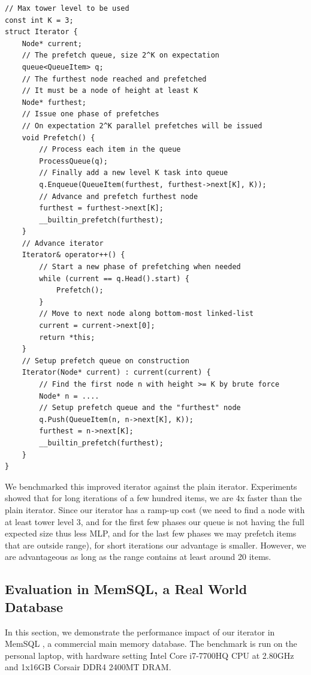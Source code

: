 \documentclass[11pt, usletter]{article}
\begin{document}
\singlespacing\begin{codebox}
\begin{verbatim}
// Max tower level to be used 
const int K = 3;
struct Iterator {
    Node* current;
    // The prefetch queue, size 2^K on expectation
    queue<QueueItem> q;
    // The furthest node reached and prefetched
    // It must be a node of height at least K
    Node* furthest;
    // Issue one phase of prefetches
    // On expectation 2^K parallel prefetches will be issued
    void Prefetch() {
        // Process each item in the queue 
        ProcessQueue(q);
        // Finally add a new level K task into queue
        q.Enqueue(QueueItem(furthest, furthest->next[K], K));
        // Advance and prefetch furthest node
        furthest = furthest->next[K];
        __builtin_prefetch(furthest);
    }
    // Advance iterator
    Iterator& operator++() {
        // Start a new phase of prefetching when needed
        while (current == q.Head().start) {
            Prefetch();
        }
        // Move to next node along bottom-most linked-list 
        current = current->next[0]; 
        return *this;
    }
    // Setup prefetch queue on construction 
    Iterator(Node* current) : current(current) {
        // Find the first node n with height >= K by brute force
        Node* n = ....
        // Setup prefetch queue and the "furthest" node
        q.Push(QueueItem(n, n->next[K], K));
        furthest = n->next[K];
        __builtin_prefetch(furthest);
    }
}
\end{verbatim}
\end{codebox}\doublespacing

We benchmarked this improved iterator against the plain iterator. 
Experiments showed that for long iterations of a few hundred items, 
we are 4x faster than the plain iterator.
Since our iterator has a ramp-up cost (we need to find a node with at least tower level 3, 
and for the first few phases our queue is not having the full expected size thus less MLP, 
and for the last few phases we may prefetch items that are outside range), 
for short iterations our advantage is smaller. 
However, we are advantageous as long as the range contains at least around 20 items.

\subsection{Evaluation in MemSQL, a Real World Database} \label{sliter_memsql}

In this section, we demonstrate the performance impact of our iterator in MemSQL \cite{memsql}, 
a commercial main memory database.
The benchmark is run on the personal laptop, 
with hardware setting Intel Core i7-7700HQ CPU at 2.80GHz and 1x16GB Corsair DDR4 2400MT DRAM.
\end{document}
